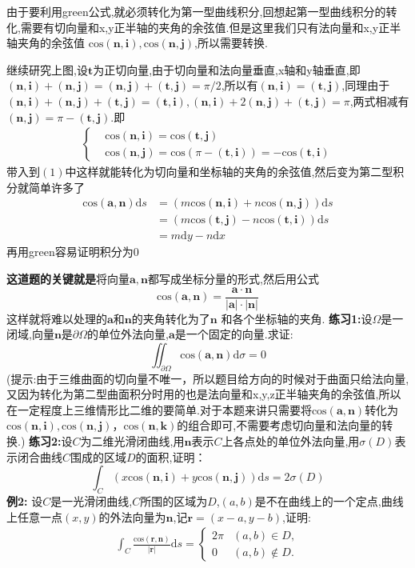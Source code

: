 \documentclass{ctexart}
\begin{document}
由于要利用green公式,就必须转化为第一型曲线积分,回想起第一型曲线积分的转化,需要有切向量和x,y正半轴的夹角的余弦值.但是这里我们只有法向量和x,y正半轴夹角的余弦值
$\mathrm{cos}(\bm{n},\bm{i}),\mathrm{cos}(\bm{n},\bm{j})$,所以需要转换.

继续研究上图,设$\bm{t}$为正切向量,由于切向量和法向量垂直,x轴和y轴垂直,即$(\bm{n,i})+(\bm{n,j})=(\bm{n,j})+(\bm{t,j})=\pi/2$,所以有$(\bm{n,i})=(\bm{t,j})$,同理由于$(\bm{n,i})+(\bm{n,j})+(\bm{t,j})=(\bm{t,i}),(\bm{n,i})+2(\bm{n,j})+(\bm{t,j})=\pi$,两式相减有$(\bm{n,j})=\pi-(\bm{t,j})$.即
\begin{eqnarray}\nonumber
\begin{cases}
&\mathrm{cos}(\bm{n,i})=\mathrm{cos}(\bm{t,j})\\
&\mathrm{cos}(\bm{n,j})=\mathrm{cos}(\pi-(\bm{t,i}))=-\mathrm{cos}(\bm{t,i})
\end{cases}
\end{eqnarray}
带入到$(1)$中这样就能转化为切向量和坐标轴的夹角的余弦值,然后变为第二型积分就简单许多了
\begin{align}
\mathrm{cos}(\bm{a,n})\mathrm{d}s&=(m\mathrm{cos}(\bm{n},\bm{i})+n\mathrm{cos}(\bm{n},\bm{j}))\mathrm{d}s\nonumber\\
&=(m\mathrm{cos}(\bm{t,j})-n\mathrm{cos}(\bm{t,i}))\mathrm{d}s\nonumber\\
&=m\mathrm{d}y-n\mathrm{d}x\nonumber
\end{align}
再用green容易证明积分为0

\textbf{这道题的关键就是}将向量$\bm{a,n}$都写成坐标分量的形式,然后用公式$$\mathrm{cos}(\bm{a,n})=\frac{\bm{a}\cdot\bm{n}}{|\bm{a}|\cdot|\bm{n}|}$$这样就将难以处理的$\bm{a}$和$\bm{n}$的夹角转化为了$\bm{n}$ 和各个坐标轴的夹角.
\newline
\newline
\indent\textbf{练习1:}设$\Omega$是一闭域,向量$\bm{n}$是$\partial \Omega$的单位外法向量,$\bm{a}$是一个固定的向量.求证:
$$\iint_{\partial \Omega}\mathrm{cos}(\bm{a,n})\mathrm{d}\sigma=0$$
(提示:由于三维曲面的切向量不唯一，所以题目给方向的时候对于曲面只给法向量,又因为转化为第二型曲面积分时用的也是法向量和x,y,z正半轴夹角的余弦值,所以在一定程度上三维情形比二维的要简单.对于本题来讲只需要将$\mathrm{cos}(\bm{a,n})$转化为$\mathrm{cos}(\bm{n,i}),\mathrm{cos}(\bm{n,j})，\mathrm{cos}(\bm{n,k})$的组合即可,不需要考虑切向量和法向量的转换.)
\newline
\newline
\indent\textbf{练习2:}设$C$为二维光滑闭曲线,用$\bm{n}$表示$C$上各点处的单位外法向量,用$\sigma(D)$表示闭合曲线$C$围成的区域$D$的面积,证明：
$$\int_{C}(x\mathrm{cos}(\bm{n,i})+y\mathrm{cos}(\bm{n,j}))\mathrm{d}s=2\sigma(D)$$
\newline
\newline
\indent\textbf{例2:}
设$C$是一光滑闭曲线,$C$所围的区域为$D$,$(a,b)$是不在曲线上的一个定点,曲线上任意一点$(x,y)$的外法向量为$\bm{n}$,记$\bm{r}=(x-a,y-b)$,证明:
\begin{eqnarray}
\int_{C} \frac{\mathrm{cos}(\bm{r,n})}{|\bm{r}|}\mathrm{d}s=
\begin{cases}
2\pi&(a,b)\in D,\\
0&(a,b)\notin D.
\end{cases}
\end{eqnarray}
\end{document}

